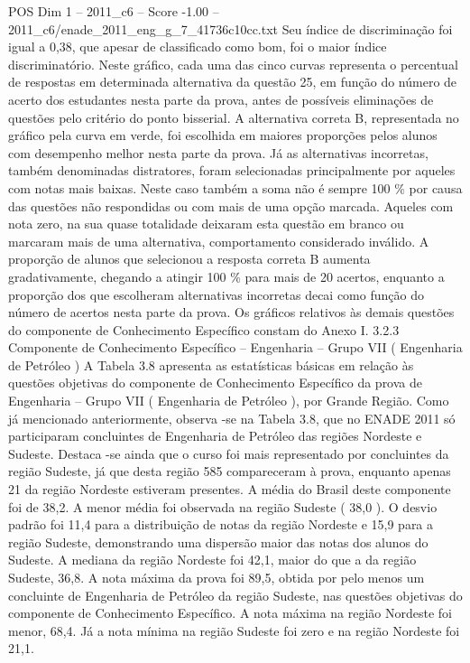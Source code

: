 \begin{textsample}{POS Dim 1 – 2011\_c6 – Score -1.00 – 2011\_c6/enade\_2011\_eng\_g\_7\_41736c10cc.txt}
Seu índice de discriminação foi igual a 0,38, que apesar de classificado como bom, foi o maior índice discriminatório.
Neste gráfico, cada uma das cinco curvas representa o percentual de respostas em determinada alternativa da questão 25, em função do número de acerto dos estudantes nesta parte da prova, antes de possíveis eliminações de questões pelo critério do ponto bisserial.
A alternativa correta B, representada no gráfico pela curva em verde, foi escolhida em maiores proporções pelos alunos com desempenho melhor nesta parte da prova.
Já as alternativas incorretas, também denominadas distratores, foram selecionadas principalmente por aqueles com notas mais baixas.
Neste caso também a soma não é sempre 100 \% por causa das questões não respondidas ou com mais de uma opção marcada.
Aqueles com nota zero, na sua quase totalidade deixaram esta questão em branco ou marcaram mais de uma alternativa, comportamento considerado inválido.
A proporção de alunos que selecionou a resposta correta B aumenta gradativamente, chegando a atingir 100 \% para mais de 20 acertos, enquanto a proporção dos que escolheram alternativas incorretas decai como função do número de acertos nesta parte da prova.
Os gráficos relativos às demais questões do componente de Conhecimento Específico constam do Anexo I. 3.2.3 Componente de Conhecimento Específico – Engenharia – Grupo VII ( Engenharia de Petróleo ) A Tabela 3.8 apresenta as estatísticas básicas em relação às questões objetivas do componente de Conhecimento Específico da prova de Engenharia – Grupo VII ( Engenharia de Petróleo ), por Grande Região.
Como já mencionado anteriormente, observa -se na Tabela 3.8, que no ENADE 2011 só participaram concluintes de Engenharia de Petróleo das regiões Nordeste e Sudeste.
Destaca -se ainda que o curso foi mais representado por concluintes da região Sudeste, já que desta região 585 compareceram à prova, enquanto apenas 21 da região Nordeste estiveram presentes.
A média do Brasil deste componente foi de 38,2.
A menor média foi observada na região Sudeste ( 38,0 ).
O desvio padrão foi 11,4 para a distribuição de notas da região Nordeste e 15,9 para a região Sudeste, demonstrando uma dispersão maior das notas dos alunos do Sudeste.
A mediana da região Nordeste foi 42,1, maior do que a da região Sudeste, 36,8.
A nota máxima da prova foi 89,5, obtida por pelo menos um concluinte de Engenharia de Petróleo da região Sudeste, nas questões objetivas do componente de Conhecimento Específico.
A nota máxima na região Nordeste foi menor, 68,4.
Já a nota mínima na região Sudeste foi zero e na região Nordeste foi 21,1.

\end{textsample}
